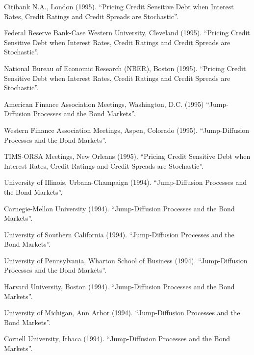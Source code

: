 \documentclass{article}
\begin{document}
\begin{etaremune}
{\item Citibank N.A., London (1995).
``Pricing Credit Sensitive Debt when Interest Rates, Credit Ratings
and Credit Spreads are Stochastic''.  

\item Federal Reserve Bank-Case Western University, Cleveland (1995).
``Pricing Credit Sensitive Debt when Interest Rates, Credit Ratings
and Credit Spreads are Stochastic''.  

\item National Bureau of Economic Research (NBER), Boston (1995).
``Pricing Credit Sensitive Debt when Interest Rates, Credit Ratings
and Credit Spreads are Stochastic''.  

\item American Finance Association Meetings, Washington, D.C. (1995)
``Jump-Diffusion Processes and the Bond Markets''.

\item Western Finance Association Meetings, Aspen, Colorado (1995).
``Jump-Diffusion Processes and the Bond Markets''.

\item TIMS-ORSA Meetings, New Orleans (1995).
``Pricing Credit Sensitive Debt when Interest Rates, Credit Ratings
and Credit Spreads are Stochastic''.  

\item University of Illinois, Urbana-Champaign (1994).
``Jump-Diffusion Processes and the Bond Markets''.

\item Carnegie-Mellon University (1994).
``Jump-Diffusion Processes and the Bond Markets''.

\item University of Southern California (1994). 
``Jump-Diffusion Processes and the Bond Markets''.

\item University of Pennsylvania, Wharton School of Business (1994).
``Jump-Diffusion Processes and the Bond Markets''.

\item Harvard University, Boston (1994).
``Jump-Diffusion Processes and the Bond Markets''.

\item University of Michigan, Ann Arbor (1994).
``Jump-Diffusion Processes and the Bond Markets''.

\item Cornell University, Ithaca (1994).
``Jump-Diffusion Processes and the Bond Markets''.

}
\end{etaremune}
\end{document}
